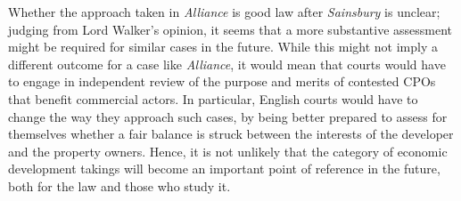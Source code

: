 Whether the approach taken in {\it Alliance} is good law after {\it Sainsbury} is unclear; judging from Lord Walker's opinion, it seems that a more substantive assessment might be required for similar cases in the future. While this might not imply a different outcome for a case like {\it Alliance}, it would mean that courts would have to engage in independent review of the purpose and merits of contested CPOs that benefit commercial actors. In particular, English courts would have to change the way they approach such cases, by being better prepared to assess for themselves whether a fair balance is struck between the interests of the developer and the property owners. Hence, it is not unlikely that the category of economic development takings will become an important point of reference in the future, both for the law and those who study it.

